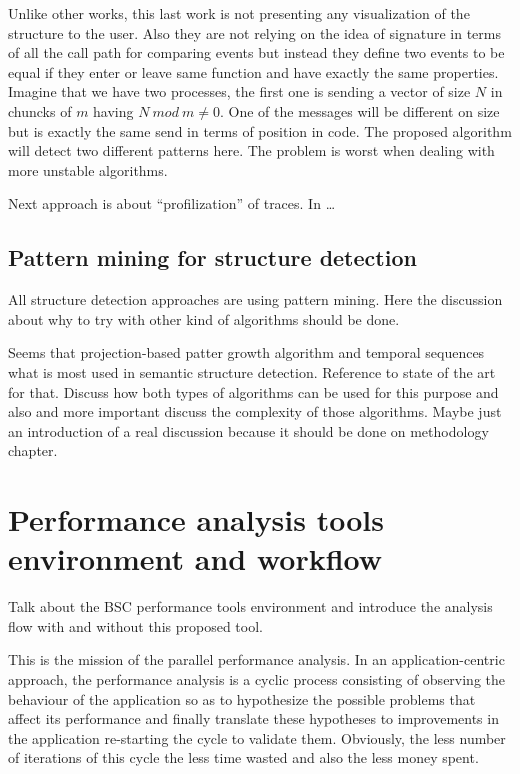 Unlike other works, this last work is not presenting any visualization of the
structure to the user. Also they are not relying on the idea of signature in
terms of all the call path for comparing events but instead they define two 
events to be equal if they enter or leave same function and have exactly the
same properties. Imagine that we have two processes, the first one is sending a
vector of size $N$ in chuncks of $m$ having $N\:mod\: m \neq 0$. One of the messages
will be different on size but is exactly the same send in terms of position in
code. The proposed algorithm will detect two different patterns here. The
problem is worst when dealing with more unstable algorithms.

Next approach is about “profilization” of traces.
In \cite{saviankou2015cube} 
\dots


\subsection{Pattern mining for structure detection}


All structure detection approaches are using pattern mining. Here the discussion
about why to try with other kind of algorithms should be done.

Seems that projection-based patter growth algorithm and temporal sequences what 
is most used in
semantic structure detection. Reference to state of the art for that. Discuss
how both types of algorithms can be used for this purpose and also and more
important discuss the complexity of those algorithms. Maybe just an introduction
of a real discussion because it should be done on methodology chapter.

\section{Performance analysis tools environment and workflow}\label{s:pt_evironment}


Talk about the BSC performance tools environment and introduce the analysis flow
with and without this proposed tool.

This is the mission of the parallel performance analysis. In an application-centric
approach, the performance analysis is a cyclic process consisting of observing 
the behaviour of the application so as to hypothesize the possible problems that 
affect its performance and finally translate these hypotheses to improvements in
the application re-starting the cycle to validate them. Obviously, the less number 
of iterations of this cycle the less time wasted and also the less money spent.




